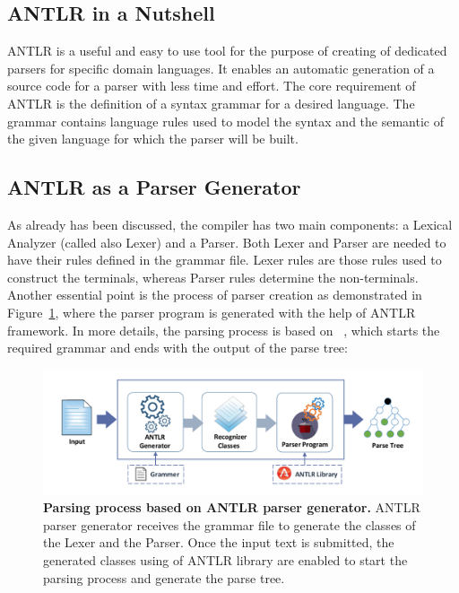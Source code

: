 \subsection{ANTLR in a Nutshell }
ANTLR is a useful and easy to use tool for the purpose of creating of dedicated parsers for specific domain languages. 
It enables an automatic generation of a source code for a parser with less time and effort. 
The core requirement of ANTLR is the definition of a syntax grammar for a desired language. 
The grammar contains language rules used to model the syntax and the semantic of the given language for which the parser will be built. 

\subsection{ANTLR as a Parser Generator}
As already has been discussed, the compiler has two main components: a Lexical Analyzer (called also Lexer) and a Parser. 
Both Lexer and Parser are needed to have their rules defined in the grammar file. 
Lexer rules are those rules used to construct the terminals, whereas Parser rules determine the non-terminals. 
Another essential point is the process of parser creation as demonstrated in Figure~\ref{Fig:ANTLR}, where the parser program is generated with the help of ANTLR framework. 
In more details, the parsing process is based on ~\cite{ANTLR:Tool:Online}, which starts the required grammar and ends with the output of the parse tree:

\begin{figure}[ht]
	\begin{center}
		\includegraphics[scale=0.52]{images/ANTLR.pdf}
				\setlength\belowcaptionskip{-5mm}
		\caption{\textbf{Parsing process based on ANTLR parser generator\cite{ANTLR:Tool:Online}.} 
		ANTLR parser generator receives the grammar file to generate the classes of the Lexer and the Parser.
		Once the input text is submitted, the generated classes using of ANTLR library are enabled to start the parsing process and generate the parse tree.}
		\label{Fig:ANTLR}
	\end{center}
\end{figure}


